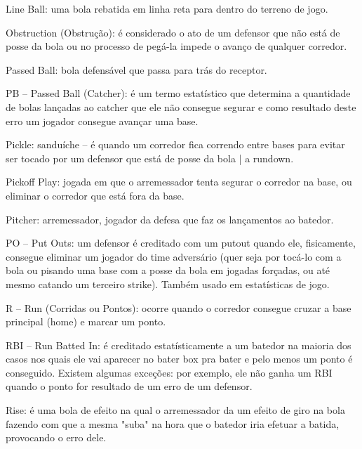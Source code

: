 
 Line Ball: uma bola rebatida em linha reta para dentro do terreno de jogo.

 Obstruction (Obstrução): é considerado o ato de um defensor que não está de posse da bola ou no processo de pegá-la impede o avanço de qualquer corredor.

 Passed Ball: bola defensável que passa para trás do receptor.

 PB -- Passed Ball (Catcher): é um termo estatístico que determina a quantidade de bolas lançadas ao catcher que ele não consegue segurar e como resultado deste erro um jogador consegue avançar uma base.

 Pickle: sanduíche -- é quando um corredor fica correndo entre bases para evitar ser tocado por um defensor que está de posse da bola | a rundown.

 Pickoff Play: jogada em que o arremessador tenta segurar o corredor na base, ou eliminar o corredor que está fora da base.

 Pitcher: arremessador, jogador da defesa que faz os lançamentos ao batedor.

 PO -- Put Outs: um defensor é creditado com um \gls{putout} quando ele, fisicamente, consegue eliminar um jogador do time adversário (quer seja por
 tocá-lo com a bola ou pisando uma base com a posse da bola em jogadas forçadas, ou até mesmo catando um terceiro strike). Também usado em
 estatísticas de jogo.

 R -- Run (Corridas ou Pontos): ocorre quando o corredor consegue cruzar a base principal (home) e marcar um ponto.

 RBI -- Run Batted In: é creditado estatísticamente a um batedor na maioria dos casos nos quais ele vai aparecer no bater box pra bater e pelo menos um ponto é conseguido. Existem algumas exceções: por exemplo, ele não ganha um RBI quando o ponto for resultado de um erro de um defensor.

 Rise: é uma bola de efeito na qual o arremessador da um efeito de giro na bola fazendo com que a mesma "suba" na hora que o batedor iria efetuar a batida, provocando o erro dele.



